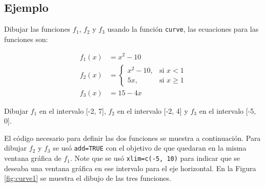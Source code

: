 \documentclass[10pt,]{krantz}
\begin{document}
\subsection*{Ejemplo}\label{ejemplo-32}


Dibujar las funciones \(f_1\), \(f_2\) y \(f_3\) usando la función
\texttt{curve}, las ecuaciones para las funciones son:

\begin{align}
f_1(x) &= x^2-10 \\
f_2(x) &= \begin{cases} x^2-10, & \mbox{si } x < 1 \\ 5 x, & \mbox{si } x \geq 1 \end{cases} \\
f_3(x) &=15-4x
\end{align}

Dibujar \(f_1\) en el intervalo {[}-2, 7{]}, \(f_2\) en el intervalo
{[}-2, 4{]} y \(f_3\) en el intervalo {[}-5, 0{]}.

El código necesario para definir las dos funciones se muestra a
continuación. Para dibujar \(f_2\) y \(f_3\) se usó \texttt{add=TRUE}
con el objetivo de que quedaran en la misma ventana gráfica de \(f_1\).
Note que se usó \texttt{xlim=c(-5,\ 10)} para indicar que se deseaba una
ventana gráfica en ese intervalo para el eje horizontal. En la Figura
\ref{fig:curve1} se muestra el dibujo de las tres funciones.
\end{document}
